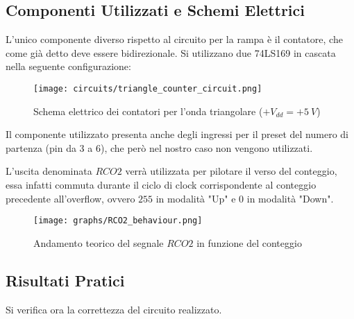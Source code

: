 
\subsection*{Componenti Utilizzati e Schemi Elettrici}


L'unico componente diverso rispetto al circuito per la rampa è il contatore, che come già
detto deve essere bidirezionale. Si utilizzano due 74LS169 \cite{74ls169} in cascata nella
seguente configurazione:

\begin{figure}[H]
    \centering
    \texttt{[image: circuits/triangle\_counter\_circuit.png]}
    \caption{Schema elettrico dei contatori per l'onda triangolare ($+V_{dd}=+5\ V$)}
    \label{triangle_counter_circuit}
\end{figure}

Il componente utilizzato presenta anche degli ingressi per il preset del numero di partenza
(pin da 3 a 6), che però nel nostro caso non vengono utilizzati.

L'uscita denominata $RCO2$ verrà utilizzata per pilotare il verso del conteggio, essa infatti
commuta durante il ciclo di clock corrispondente al conteggio precedente all'overflow, ovvero
$255$ in modalità "Up" e $0$ in modalità "Down".

\begin{figure}[H]
    \centering
    \texttt{[image: graphs/RCO2\_behaviour.png]}
    \caption{Andamento teorico del segnale $RCO2$ in funzione del conteggio}
    \label{RCO2_behaviour}
\end{figure}


\subsection*{Risultati Pratici}


Si verifica ora la correttezza del circuito realizzato.

